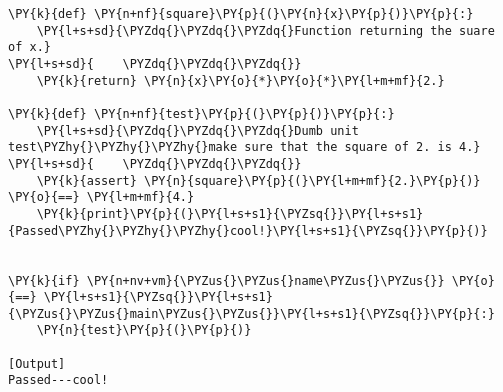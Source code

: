 \begin{Verbatim}[label=\makebox{\url{https://github.com/lucabaldini/cmepda/tree/master/slides/latex/snippets/unit\_test\_naive.py}},commandchars=\\\{\}]
\PY{k}{def} \PY{n+nf}{square}\PY{p}{(}\PY{n}{x}\PY{p}{)}\PY{p}{:}
    \PY{l+s+sd}{\PYZdq{}\PYZdq{}\PYZdq{}Function returning the suare of x.}
\PY{l+s+sd}{    \PYZdq{}\PYZdq{}\PYZdq{}}
    \PY{k}{return} \PY{n}{x}\PY{o}{*}\PY{o}{*}\PY{l+m+mf}{2.}

\PY{k}{def} \PY{n+nf}{test}\PY{p}{(}\PY{p}{)}\PY{p}{:}
    \PY{l+s+sd}{\PYZdq{}\PYZdq{}\PYZdq{}Dumb unit test\PYZhy{}\PYZhy{}\PYZhy{}make sure that the square of 2. is 4.}
\PY{l+s+sd}{    \PYZdq{}\PYZdq{}\PYZdq{}}
    \PY{k}{assert} \PY{n}{square}\PY{p}{(}\PY{l+m+mf}{2.}\PY{p}{)} \PY{o}{==} \PY{l+m+mf}{4.}
    \PY{k}{print}\PY{p}{(}\PY{l+s+s1}{\PYZsq{}}\PY{l+s+s1}{Passed\PYZhy{}\PYZhy{}\PYZhy{}cool!}\PY{l+s+s1}{\PYZsq{}}\PY{p}{)}


\PY{k}{if} \PY{n+nv+vm}{\PYZus{}\PYZus{}name\PYZus{}\PYZus{}} \PY{o}{==} \PY{l+s+s1}{\PYZsq{}}\PY{l+s+s1}{\PYZus{}\PYZus{}main\PYZus{}\PYZus{}}\PY{l+s+s1}{\PYZsq{}}\PY{p}{:}
    \PY{n}{test}\PY{p}{(}\PY{p}{)}

[Output]
Passed---cool!
\end{Verbatim}